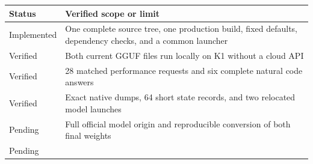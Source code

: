 \documentclass[10pt,a4paper]{article}
\begin{document}
\begin{longtable}[]{@{}ll@{}}
\toprule
\begin{minipage}[b]{0.47\columnwidth}\raggedright
Status\strut
\end{minipage} & \begin{minipage}[b]{0.47\columnwidth}\raggedright
Verified scope or limit\strut
\end{minipage}\tabularnewline
\midrule
\endhead
\begin{minipage}[t]{0.47\columnwidth}\raggedright
Implemented\strut
\end{minipage} & \begin{minipage}[t]{0.47\columnwidth}\raggedright
One complete source tree, one production build, fixed defaults,
dependency checks, and a common launcher\strut
\end{minipage}\tabularnewline
\begin{minipage}[t]{0.47\columnwidth}\raggedright
Verified\strut
\end{minipage} & \begin{minipage}[t]{0.47\columnwidth}\raggedright
Both current GGUF files run locally on K1 without a cloud API\strut
\end{minipage}\tabularnewline
\begin{minipage}[t]{0.47\columnwidth}\raggedright
Verified\strut
\end{minipage} & \begin{minipage}[t]{0.47\columnwidth}\raggedright
28 matched performance requests and six complete natural code
answers\strut
\end{minipage}\tabularnewline
\begin{minipage}[t]{0.47\columnwidth}\raggedright
Verified\strut
\end{minipage} & \begin{minipage}[t]{0.47\columnwidth}\raggedright
Exact native dumps, 64 short state records, and two relocated model
launches\strut
\end{minipage}\tabularnewline
\begin{minipage}[t]{0.47\columnwidth}\raggedright
Pending\strut
\end{minipage} & \begin{minipage}[t]{0.47\columnwidth}\raggedright
Full official model origin and reproducible conversion of both final
weights\strut
\end{minipage}\tabularnewline
\begin{minipage}[t]{0.47\columnwidth}\raggedright
Pending\strut
\end{minipage} & \begin{minipage}[t]{0.47\columnwidth}\raggedright

\end{minipage}
\end{longtable}
\end{document}

